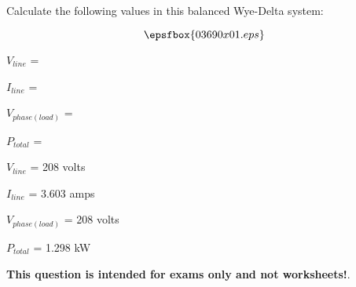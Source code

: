 

Calculate the following values in this balanced Wye-Delta system:

$$\epsfbox{03690x01.eps}$$

\medskip
\item{} $V_{line}$ =
\vskip 5pt
\item{} $I_{line}$ =
\vskip 5pt
\item{} $V_{phase(load)}$ =
\vskip 5pt
\item{} $P_{total}$ =
\medskip







\medskip
\item{} $V_{line}$ = 208 volts
\vskip 5pt
\item{} $I_{line}$ = 3.603 amps
\vskip 5pt
\item{} $V_{phase(load)}$ = 208 volts
\vskip 5pt
\item{} $P_{total}$ = 1.298 kW
\medskip







{\bf This question is intended for exams only and not worksheets!}.




